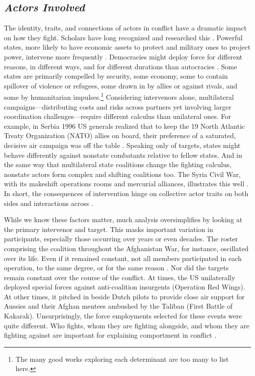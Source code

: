 \documentclass[fleqn,12pt]{article}
\begin{document}
\subsection*{\textit{Actors Involved}}
The identity, traits, and connections of actors in conflict have a dramatic impact on how they fight. Scholars have long recognized and researched this \citep{huth_majorpowerintervention_1998}. Powerful states, more likely to have economic assets to protect and military ones to project power, intervene more frequently \citep{sullivan_militaryinterventionpowerful_2009}. Democracies might deploy force for different reasons, in different ways, and for different durations than autocracies \citep{caverley_democraticmilitarismvoting_2014, talmadge_differentthreatsdifferent_2016}. Some states are primarily compelled by security, some economy, some to contain spillover of violence or refugees, some drawn in by allies or against rivals, and some by humanitarian impulses.\footnote{The many good works exploring each determinant are too many to list here.} Considering intervenors alone, multilateral campaigns—distributing costs and risks across partners yet involving larger coordination challenges—require different calculus than unilateral ones. For example, in Serbia 1996 US generals realized that to keep the 19 North Atlantic Treaty Organization (NATO) allies on board, their preference of a saturated, decisive air campaign was off the table \citep{cooper_politicsairstrikes_2001}. Speaking only of targets, states might behave differently against nonstate combatants relative to fellow states. And in the same way that multilateral state coalitions change the fighting calculus, nonstate actors form complex and shifting coalitions too. The Syria Civil War, with its makeshift operations rooms and mercurial alliances, illustrates this well \citep{cranmer_coalitionqualitymultinational_2018}. In short, the consequences of intervention hinge on collective actor traits on both sides and interactions across \citep{carment_threecompanyevaluating_1998, caverley_mythmilitarymyopia_2009}.

While we know these factors matter, much analysis oversimplifies by looking at the primary intervenor and target. This masks important variation in participants, especially those occurring over years or even decades. The roster comprising the coalition throughout the Afghanistan War, for instance, oscillated over its life. Even if it remained constant, not all members participated in each operation, to the same degree, or for the same reason \citep{gannon_keepingyourfriends_2021}. Nor did the targets remain constant over the course of the conflict. At times, the US unilaterally deployed special forces against anti-coalition insurgents (Operation Red Wings). At other times, it pitched in beside Dutch pilots to provide close air support for Aussies and their Afghan mentees ambushed by the Taliban (First Battle of Kakarak). Unsurprisingly, the force employments selected for these events were quite different. Who fights, whom they are fighting alongside, and whom they are fighting against are important for explaining comportment in conflict \citep{cappellazielinski_understandingbattlefieldcoalitions_2022}.
\end{document}
